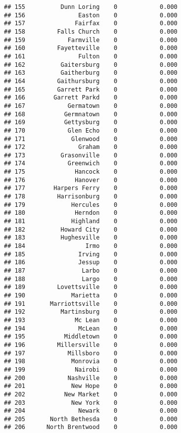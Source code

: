 \documentclass[]{article}
\begin{document}
\begin{verbatim}
## 155          Dunn Loring    0            0.000
## 156               Easton    0            0.000
## 157              Fairfax    0            0.000
## 158         Falls Church    0            0.000
## 159            Farmville    0            0.000
## 160         Fayetteville    0            0.000
## 161               Fulton    0            0.000
## 162          Gaitersburg    0            0.000
## 163          Gaitherburg    0            0.000
## 164         Gaithursburg    0            0.000
## 165         Garrett Park    0            0.000
## 166        Garrett Parkd    0            0.000
## 167            Germatown    0            0.000
## 168           Germnatown    0            0.000
## 169           Gettysburg    0            0.000
## 170            Glen Echo    0            0.000
## 171             Glenwood    0            0.000
## 172               Graham    0            0.000
## 173          Grasonville    0            0.000
## 174            Greenwich    0            0.000
## 175              Hancock    0            0.000
## 176              Hanover    0            0.000
## 177        Harpers Ferry    0            0.000
## 178         Harrisonburg    0            0.000
## 179             Hercules    0            0.000
## 180              Herndon    0            0.000
## 181             Highland    0            0.000
## 182          Howard City    0            0.000
## 183          Hughesville    0            0.000
## 184                 Irmo    0            0.000
## 185               Irving    0            0.000
## 186               Jessup    0            0.000
## 187                Larbo    0            0.000
## 188                Largo    0            0.000
## 189         Lovettsville    0            0.000
## 190             Marietta    0            0.000
## 191       Marriottsville    0            0.000
## 192          Martinsburg    0            0.000
## 193              Mc Lean    0            0.000
## 194               McLean    0            0.000
## 195           Middletown    0            0.000
## 196         Millersville    0            0.000
## 197            Millsboro    0            0.000
## 198             Monrovia    0            0.000
## 199              Nairobi    0            0.000
## 200            Nashville    0            0.000
## 201             New Hope    0            0.000
## 202           New Market    0            0.000
## 203             New York    0            0.000
## 204               Newark    0            0.000
## 205       North Bethesda    0            0.000
## 206      North Brentwood    0            0.000

\end{verbatim}
\end{document}
